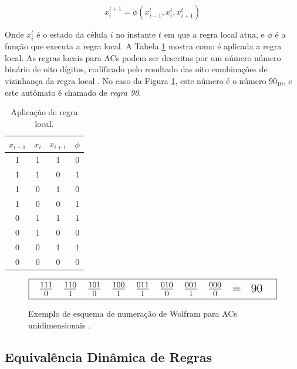 \documentclass[12pt,a4paper]{article}
\begin{document}
\begin{equation}
x^{t+1}_i = \phi(x^t_{i-1}, x^t_i, x^t_{i+1})
\end{equation}

Onde $x^t_i$ é o estado da célula $i$ no instante $t$ em que a regra local atua, e $\phi$ é a função
que executa a regra local.  A Tabela \ref{tab:localrule} mostra como é aplicada a regra local.
As regras locais para ACs podem ser descritas por um número número binário de
oito dígitos, codificado pelo resultado das oito combinações de vizinhança da regra local
. No caso da Figura \ref{fig:celnumbering}, este número é o número $90_{10}$, e
este autômato é chamado de \textit{regra 90}.

\begin{table}[htp]
\begin{center}
\begin{tabular}{|c|c|c|c|}
\hline
\Large $x_{i-1}$ & \Large $x_i$ & \Large $x_{i+1}$ & \Large $\phi$ \\ \hline
1 & 1 & 1 & 0 \\ \hline
1 & 1 & 0 & 1 \\ \hline
1 & 0 & 1 & 0 \\ \hline
1 & 0 & 0 & 1 \\ \hline
0 & 1 & 1 & 1 \\ \hline
0 & 1 & 0 & 0 \\ \hline
0 & 0 & 1 & 1 \\ \hline
0 & 0 & 0 & 0 \\ \hline
\end{tabular}
\caption{Aplicação de regra local.}
\label{tab:localrule}
\end{center}
\end{table}

\begin{figure}[htp]
\begin{center}
\[ \fbox {
{\Large
\begin{tabular}{c c c c c c c c c c c}
$\frac{1 1 1}{0}$ & $\frac{1 1 0}{1}$ & $\frac{1 0 1}{0}$ & $\frac{1 0 0}{1}$ & 
$\frac{0 1 1}{1}$ & $\frac{0 1 0}{0}$ & $\frac{0 0 1}{1}$ & $\frac{0 0 0}{0}$ &
= & 90
\end{tabular}
}
} \]
\caption{Exemplo de esquema de numeração de Wolfram para ACs unidimensionais
.}
\label{fig:celnumbering}
\end{center}
\end{figure}

\subsection{Equivalência Dinâmica de Regras}
\end{document}
